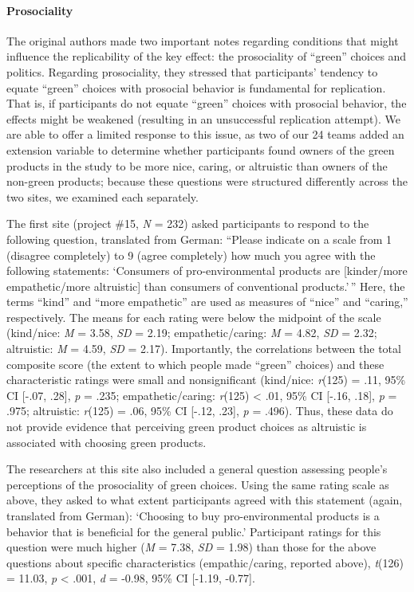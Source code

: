 \documentclass[
]{article}
\begin{document}
\paragraph{Prosociality}\label{prosociality}

The original authors made two important notes regarding conditions that
might influence the replicability of the key effect: the prosociality of
``green'' choices and politics. Regarding prosociality, they stressed
that participants' tendency to equate ``green'' choices with prosocial
behavior is fundamental for replication. That is, if participants do not
equate ``green'' choices with prosocial behavior, the effects might be
weakened (resulting in an unsuccessful replication attempt). We are able
to offer a limited response to this issue, as two of our 24 teams added
an extension variable to determine whether participants found owners of
the green products in the study to be more nice, caring, or altruistic
than owners of the non-green products; because these questions were
structured differently across the two sites, we examined each
separately.

The first site (project \#15, \emph{N} = 232) asked participants to
respond to the following question, translated from German: ``Please
indicate on a scale from 1 (disagree completely) to 9 (agree completely)
how much you agree with the following statements: `Consumers of
pro-environmental products are {[}kinder/more empathetic/more
altruistic{]} than consumers of conventional products.'\,'' Here, the
terms ``kind'' and ``more empathetic'' are used as measures of ``nice''
and ``caring,'' respectively. The means for each rating were below the
midpoint of the scale (kind/nice: \emph{M} = 3.58, \emph{SD} = 2.19;
empathetic/caring: \emph{M} = 4.82, \emph{SD} = 2.32; altruistic:
\emph{M} = 4.59, \emph{SD} = 2.17). Importantly, the correlations
between the total composite score (the extent to which people made
``green'' choices) and these characteristic ratings were small and
nonsignificant (kind/nice: \emph{r}(125) = .11, 95\% CI {[}-.07, .28{]},
\emph{p} = .235; empathetic/caring: \emph{r}(125) \textless{} .01, 95\%
CI {[}-.16, .18{]}, \emph{p} = .975; altruistic: \emph{r}(125) = .06,
95\% CI {[}-.12, .23{]}, \emph{p} = .496). Thus, these data do not
provide evidence that perceiving green product choices as altruistic is
associated with choosing green products.

The researchers at this site also included a general question assessing
people's perceptions of the prosociality of green choices. Using the
same rating scale as above, they asked to what extent participants
agreed with this statement (again, translated from German): `Choosing to
buy pro-environmental products is a behavior that is beneficial for the
general public.' Participant ratings for this question were much higher
(\emph{M} = 7.38, \emph{SD} = 1.98) than those for the above questions
about specific characteristics (empathic/caring, reported above),
\emph{t}(126) = 11.03, \emph{p} \textless{} .001, \emph{d} = -0.98, 95\%
CI {[}-1.19, -0.77{]}.
\end{document}
